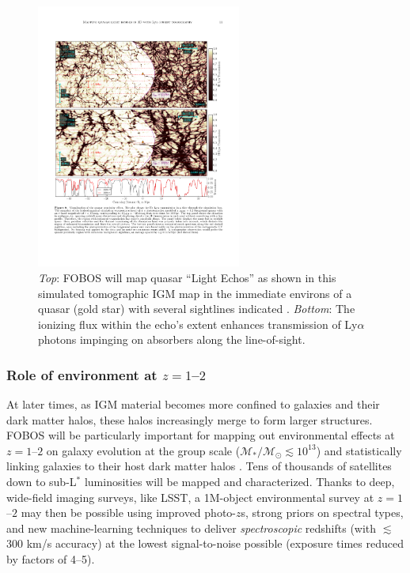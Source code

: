 \begin{figure}
%
\includegraphics[width=0.6\textwidth]{figs/qso_LightEcho_v1.pdf}
%
\caption{{\it Top}: FOBOS will map quasar ``Light Echos'' as shown in this simulated
tomographic IGM map in the immediate environs of a quasar (gold star)
with several sightlines indicated
\citep[from][]{2018arXiv181005156S}. {\it Bottom}: The ionizing flux
within the echo's extent enhances transmission of Ly$\alpha$ photons
impinging on absorbers along the line-of-sight.}
\label{fig:LightEcho}
\end{figure}

\subsubsection{Role of environment at $z=1$--$2$ }

At later times, as IGM material becomes more confined to galaxies and their dark matter halos, these halos
increasingly merge to form larger structures.  FOBOS will be particularly important for mapping out environmental
effects at $z=1$--$2$ on galaxy evolution at the group scale ($\mathcal{M_\ast/M_\odot} \lesssim 10^{13}$) and
statistically linking galaxies to their host dark matter halos \citep{behroozi19}.  Tens
of thousands of satellites down to sub-L$^*$ luminosities will be mapped and characterized. Thanks to deep, wide-field
imaging surveys, like LSST, a 1M-object environmental survey at $z=1$--$2$ may then be possible using improved
photo-$z$s, strong priors on spectral types, and new machine-learning techniques to deliver {\it spectroscopic}
redshifts (with $\lesssim$300 km/s accuracy) at the lowest signal-to-noise possible (exposure times reduced by factors
of 4--5).

